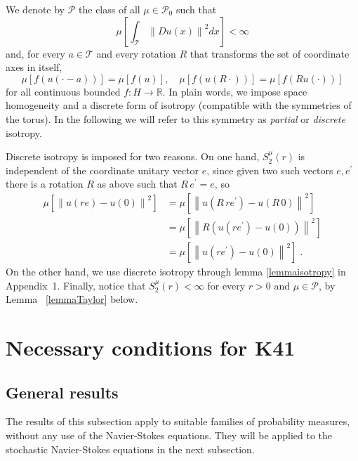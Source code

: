 \documentclass[11pt]{preprint}
\begin{document}
We denote by $\mathcal{P}$ the class of all $\mu\in\mathcal{P}_{0}$ such that
\[
\mu\left[  \int_{\mathcal{T}}\left\|  Du\left(  x\right)  \right\|
^{2}dx\right]  <\infty
\]
and, for every $a\in\mathcal{T}$ and every rotation $R$ that transforms the set
of coordinate axes in itself,
\begin{equation}
\mu\left[  f\left(  u\left(  \cdot-a\right)  \right)  \right]  =\mu\left[
f\left(  u\right)  \right]  ,\quad\mu\left[  f\left(  u\left(  R\cdot\right)
\right)  \right]  =\mu\left[  f\left(  Ru(\cdot)\right)  \right]
\label{assumpintegr}%
\end{equation}
for all continuous bounded $f:H\rightarrow\mathbb{R}$. In plain words, we
impose space homogeneity and a discrete form of isotropy (compatible with the
symmetries of the torus). In the following we will refer to this symmetry as \emph{partial} or \emph{discrete} isotropy.


Discrete isotropy is imposed for two reasons. On one hand, $S_{2}^{\mu}\left(
r\right)  $ is independent of the coordinate unitary vector $e$, since given
two such vectors $e,e^{\prime}$ there is a rotation $R$ as above such that
$R\,e^{\prime}=e$, so
\begin{align*}
\mu\left[  \left\|  u\left(  re\right)  -u\left(  0\right)  \right\|
^{2}\right]   &=\mu\left[  \left\|  u\left(  R\,re^{\prime}\right)
-u\left(  R\,0\right)  \right\|  ^{2}\right] \\
& =\mu\left[  \left\|  R\left(  u\left(  re^{\prime}\right)  -u\left(
0\right)  \right)  \right\|  ^{2}\right] \\
&=  \mu\left[  \left\|  u\left(  re^{\prime}\right)  -u\left(  0\right)
\right\|  ^{2}\right]\;.
\end{align*}
On the other hand, we use discrete
isotropy through lemma \ref{lemmaisotropy} in Appendix~1. Finally, notice that $S_{2}^{\mu}(r)< \infty$ for every $r > 0$ and $\mu \in \mathcal{P}$, by Lemma~
\ref{lemmaTaylor} below.

\section{Necessary conditions for K41}
\label{sec:NecCond}

\subsection{General results}

The results of this subsection apply to suitable families of probability
measures, without any use of the Navier-Stokes equations. They will be applied
to the stochastic Navier-Stokes equations in the next subsection.
\end{document}
